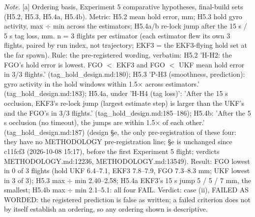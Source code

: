 \begin{table}[htbp]
\textit{Note.} [a] Ordering basis, Experiment 5 comparative hypotheses, final-build sets (H5.2, H5.3, H5.4a, H5.4b). Metric: H5.2 mean hold error, mm; H5.3 hold gyro activity, max $\div$ min across the estimators; H5.4a/b re-lock jump after the 15 s / 5 s tag loss, mm. n = 3 flights per estimator (each estimator flew its own 3 flights, paired by run index, not trajectory; EKF3 = the EKF3-flying hold set at the far spawn). Rule: the pre-registered wording, verbatim: H5.2 'H-H2: the FGO's hold error is lowest. FGO $<$ EKF3 and FGO $<$ UKF mean hold error in 3/3 flights.' (tag\_hold\_design.md:180); H5.3 'P-H3 (smoothness, prediction): gyro activity in the hold windows within 1.5$\times$ across estimators.' (tag\_hold\_design.md:183); H5.4a, under 'H-H4 (tag loss)': 'After the 15 s occlusion, EKF3's re-lock jump (largest estimate step) is larger than the UKF's and the FGO's in 3/3 flights.' (tag\_hold\_design.md:185--186); H5.4b: 'After the 5 s occlusion (no timeout), the jumps are within 1.5$\times$ of each other.' (tag\_hold\_design.md:187) (design \S{}e, the only pre-registration of these four: they have no METHODOLOGY pre-registration line; \S{}e is unchanged since c11fcf3 (2026-10-08 15:17), before the first Experiment 5 flight; verdicts METHODOLOGY.md:12236, METHODOLOGY.md:13549). Result: FGO lowest in 0 of 3 flights (hold UKF 6.4--7.1, EKF3 7.8--7.9, FGO 7.3--8.3 mm; UKF lowest in 3 of 3); H5.3 max $\div$ min 2.40--2.58; H5.4a EKF3's 15 s jump 5 / 5 / 7 mm, the smallest; H5.4b max $\div$ min 2.1--5.1: all four FAIL. Verdict: case (ii), FAILED AS WORDED: the registered prediction is false as written; a failed criterion does not by itself establish an ordering, so any ordering shown is descriptive.\par
\end{table}
